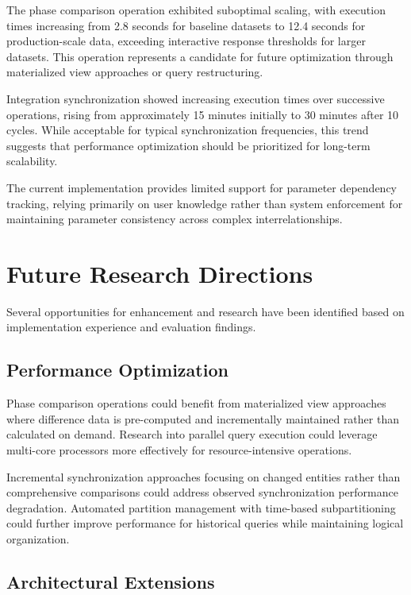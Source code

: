 The phase comparison operation exhibited suboptimal scaling, with execution times increasing from 2.8 seconds for baseline datasets to 12.4 seconds for production-scale data, exceeding interactive response thresholds for larger datasets. This operation represents a candidate for future optimization through materialized view approaches or query restructuring.

Integration synchronization showed increasing execution times over successive operations, rising from approximately 15 minutes initially to 30 minutes after 10 cycles. While acceptable for typical synchronization frequencies, this trend suggests that performance optimization should be prioritized for long-term scalability.

The current implementation provides limited support for parameter dependency tracking, relying primarily on user knowledge rather than system enforcement for maintaining parameter consistency across complex interrelationships.

\section{Future Research Directions}
\label{sec:future-research}

Several opportunities for enhancement and research have been identified based on implementation experience and evaluation findings.

\subsection{Performance Optimization}
\label{subsec:performance-optimization}

Phase comparison operations could benefit from materialized view approaches where difference data is pre-computed and incrementally maintained rather than calculated on demand. Research into parallel query execution could leverage multi-core processors more effectively for resource-intensive operations.

Incremental synchronization approaches focusing on changed entities rather than comprehensive comparisons could address observed synchronization performance degradation. Automated partition management with time-based subpartitioning could further improve performance for historical queries while maintaining logical organization.

\subsection{Architectural Extensions}
\label{subsec:architectural-extensions}

